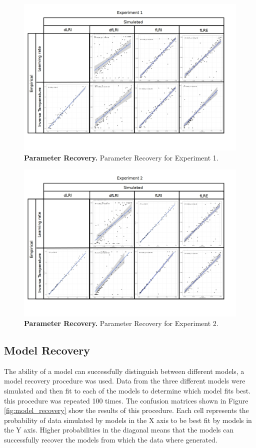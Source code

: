 \documentclass[a4paper,12pt]{article}
\begin{document}
\begin{figure}[ht!]
\centerline
{\includegraphics[width=1.3\textwidth]{figures/ParameterRecoveryExp1.jpg}}
\caption{\textbf{Parameter Recovery.} Parameter Recovery for Experiment 1.}
\label{fig:parameter_recoveryExp1}
\end{figure}

\begin{figure}[ht!]
\centerline
{\includegraphics[width=1.3\textwidth]{figures/ParameterRecoveryExp2.jpg}}
\caption{\textbf{Parameter Recovery.} Parameter Recovery for Experiment 2.}
\label{fig:parameter_recoveryExp2}
\end{figure}


\subsection*{Model Recovery}
The ability of a model can successfully distinguish between different models, a model recovery procedure was used. Data from the three different models were simulated and then fit to each of the models to determine which model fits best. this procedure was repeated 100 times. The confusion matrices shown in Figure \ref{fig:model_recovery} show the results of this procedure. Each cell represents the probability of data simulated by models in the X axis to be best fit by models in the Y axis. Higher probabilities in the diagonal means that the models can successfully recover the models from which the data where generated.  
\end{document}
